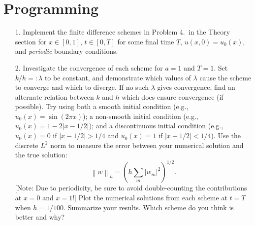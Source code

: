 \documentclass{article}
\providecommand{\abs}[1]{\left\lvert#1\right\rvert}
\providecommand{\norm}[1]{\left\lVert#1\right\rVert}
\begin{document}
\section{Programming}

\begin{itemize}

\item[1.] Implement the finite difference schemes in Problem 4.\ in the Theory section for $x \in [0,1]$, $t \in [0,T]$ for some final time $T$, $u(x,0) = u_0(x)$, and \emph{periodic} boundary conditions.

\item[2.] Investigate the convergence of each scheme for $a = 1$ and $T = 1$. Set $k/h =: \lambda$ to be constant, and demonstrate which values of $\lambda$ cause the scheme to converge and which to diverge. If no such $\lambda$ gives convergence, find an alternate relation between $k$ and $h$ which does ensure convergence (if possible). Try using both a smooth initial condition (e.g., $u_0(x) = \sin(2 \pi x)$); a non-smooth initial condition (e.g., $u_0(x) = 1 - 2 \abs{x - 1/2}$); and a discontinuous initial condition (e.g., $u_0(x) = 0$ if $\abs{x - 1/2} > 1/4$ and $u_0(x) = 1$ if $\abs{x - 1/2} < 1/4$). Use the discrete $L^2$ norm to measure the error between your numerical solution and the true solution:
\begin{equation*}
\norm{w}_h = \left( h \sum_m \abs{w_m}^2 \right)^{1/2}.
\end{equation*}
[Note: Due to periodicity, be sure to avoid double-counting the contributions at $x = 0$ and $x = 1$!] Plot the numerical solutions from each scheme at $t = T$ when $h = 1/100$. Summarize your results. Which scheme do you think is better and why?

\end{itemize}
\end{document}
